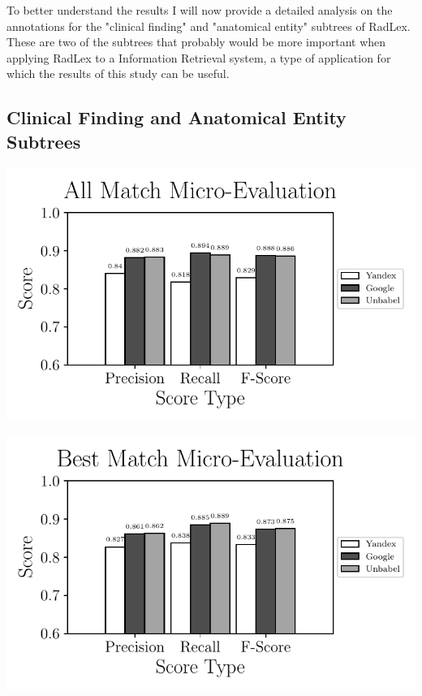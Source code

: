 To better understand the results I will now provide a detailed analysis on the annotations for the "clinical finding" and "anatomical entity" subtrees of RadLex. These are two of the subtrees that probably would be more important when applying RadLex to a Information Retrieval system, a type of application for which the results of this study can be useful.

\subsection{Clinical Finding and Anatomical Entity Subtrees}

\includegraphics{SupportFiles/plots/all_match_micro_clinical_anatomical_subtrees_plot.pdf}

\includegraphics{SupportFiles/plots/best_match_micro_clinical_anatomical_subtrees_plot.pdf}

